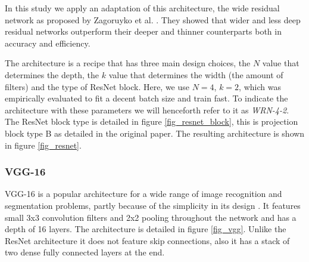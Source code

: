 \documentclass[journal]{IEEEtran}
\begin{document}
In this study we apply an adaptation of this architecture, the wide residual network as proposed by Zagoruyko et al. \cite{wideresnet}. They showed that wider and less deep residual networks outperform their deeper and thinner counterparts both in accuracy and efficiency. 

The architecture is a recipe that has three main design choices, the $N$ value that determines the depth, the $k$ value that determines the width (the amount of filters) and the type of ResNet block. Here, we use $N=4$, $k=2$, which was empirically evaluated to fit a decent batch size and train fast. To indicate the architecture with these parameters we will henceforth refer to it as \emph{WRN-4-2}. The ResNet block type is detailed in figure \ref{fig_resnet_block}, this is projection block type B as detailed in the original paper. The resulting architecture is shown in figure \ref{fig_resnet}.
\medskip
\subsubsection{VGG-16}
VGG-16 is a popular architecture for a wide range of image recognition and segmentation problems, partly because of the simplicity in its design \cite{vgg}. It features small 3x3 convolution filters and 2x2 pooling throughout the network and has a depth of 16 layers. The architecture is detailed in figure \ref{fig_vgg}. Unlike the ResNet architecture it does not feature skip connections, also it has a stack of two dense fully connected layers at the end.
\end{document}
